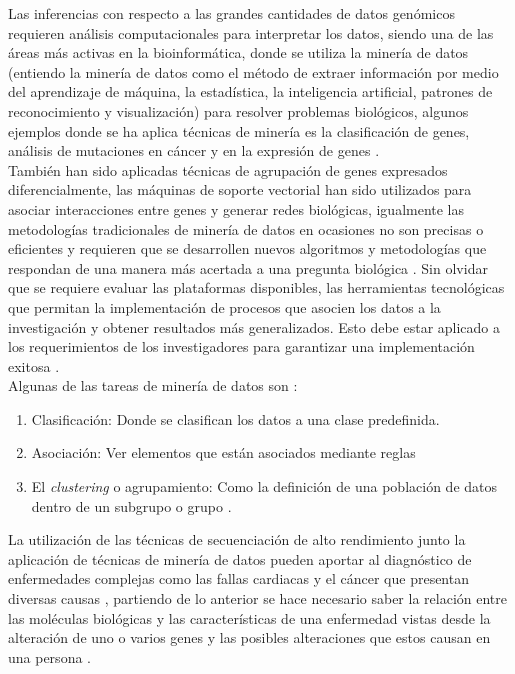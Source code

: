 Las inferencias con respecto a las grandes cantidades de datos genómicos requieren análisis computacionales para interpretar los datos, siendo una de las áreas más activas en la bioinformática, donde se utiliza la minería de datos (entiendo la minería de datos como el método de extraer información por medio del aprendizaje de máquina, la estadística, la inteligencia artificial, patrones de reconocimiento y visualización) para resolver problemas biológicos, algunos ejemplos donde se ha aplica técnicas de minería es la clasificación de genes, análisis de mutaciones en cáncer y en la expresión de genes \cite{Littlefield}. \\

También han sido aplicadas técnicas de agrupación de genes expresados diferencialmente, las máquinas de soporte vectorial han sido utilizados para asociar interacciones entre genes y generar redes biológicas, igualmente las metodologías tradicionales de minería de datos en ocasiones no son precisas o eficientes y requieren que se desarrollen nuevos algoritmos y metodologías que respondan de una manera más acertada a una pregunta biológica \cite{Zaki2007}. Sin olvidar que se requiere evaluar las plataformas disponibles, las herramientas tecnológicas que permitan  la implementación de procesos que asocien los datos a  la investigación  y obtener resultados más generalizados.  Esto debe estar aplicado a los requerimientos de los investigadores para garantizar una implementación exitosa \cite{Bustos2007,Zaki2007}.\\

Algunas de las tareas de minería de datos son \cite{Littlefield}:

\begin{enumerate}[1.]
	\item Clasificación: Donde se clasifican los datos a una clase predefinida.
	\item Asociación: Ver elementos que están asociados mediante reglas
	\item El \textit{clustering} o agrupamiento: Como la definición de una población de datos dentro de un subgrupo o grupo .
\end{enumerate}

La utilización de las técnicas de secuenciación de alto rendimiento junto  la aplicación de técnicas de minería de datos pueden aportar al diagnóstico de enfermedades complejas  como las fallas cardiacas y el cáncer que presentan diversas causas \cite{Hannah-Shmouni2015}, partiendo de lo anterior se hace necesario saber la relación entre las moléculas biológicas y las características de una enfermedad vistas desde la alteración de uno o varios genes y las posibles alteraciones que estos causan en una persona \cite{Li2014}.

